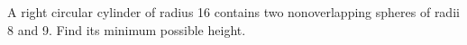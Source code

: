 A right circular cylinder of radius 16 contains two nonoverlapping spheres of radii 8 and 9. Find its minimum possible height.
